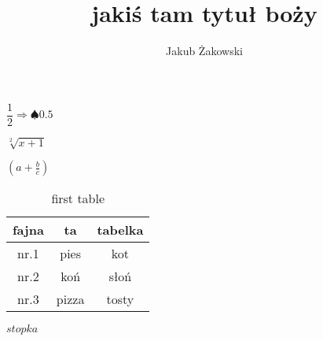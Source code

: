 \documentclass[a4paper]{article}
\title{jakiś tam tytuł boży}
\begin{document}
\author{Jakub Żakowski}
\maketitle
$ \dfrac{1}{2}\Rightarrow \spadesuit 0.5 $

\begin{flushright}
$\sqrt[2]{x+1}$
\end{flushright}
$\left(a+\frac{b}{c}\right)$

\begin{table}
	\centering
		\begin{tabular}{|c|c|c|}
			\hline
			fajna & ta & tabelka\\
			\hline
			nr.1 & pies & kot\\
			\hline
			nr.2 & koń & słoń\\
			\hline
			nr.3 & pizza & tosty\\
			\hline
		\end{tabular}
		\caption{first table}
		\label{pierwsza tabelka}
\end{table}



$stopka$
\end{document}
